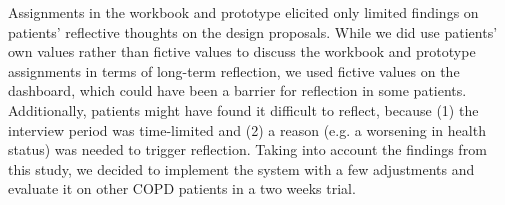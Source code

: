 Assignments in the workbook and prototype elicited only limited findings on patients’ reflective thoughts on the design proposals. While we did use patients’ own values rather than fictive values to discuss the workbook and prototype assignments in terms of long-term reflection, we used fictive values on the dashboard, which could have been a barrier for reflection in some patients. Additionally, patients might have found it difficult to reflect, because (1) the interview period was time-limited and (2) a reason (e.g. a worsening in health status) was needed to trigger reflection. Taking into account the findings from this study, we decided to implement the system with a few adjustments and evaluate it on other COPD patients in a two weeks trial. 
